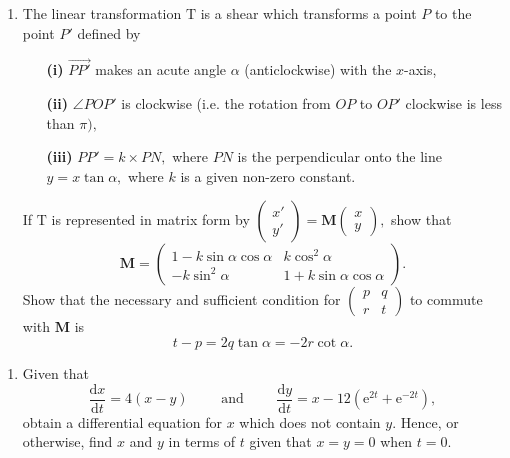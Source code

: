 \documentclass[a4, 11pt]{report}
\newlength{\qspace}
\newcounter{qnumber}
\newenvironment{question}%
 {\vspace{\qspace}
  \begin{enumerate}[\bfseries 1\quad][10]%
    \setcounter{enumi}{\value{qnumber}}%
    \item%
 }
{
  \end{enumerate}
  \filbreak
  \stepcounter{qnumber}
 }
\begin{document}
\begin{question}
The linear transformation $\mathrm{T}$ is a shear which transforms
a point $P$ to the point $P'$ defined by 

\begin{itemize}
\setlength{\itemsep}{3mm}
\item[\bf (i)] $\overrightarrow{PP'}$ makes an acute angle $\alpha$ (anticlockwise)
with the $x$-axis, 
\item[\bf (ii)] $\angle POP'$ is clockwise (i.e. the rotation from $OP$ to $OP'$
clockwise is less than $\pi),$ 
\item[\bf (iii)] $PP'=k\times PN,$ where $PN$ is the perpendicular onto the line
$y=x\tan\alpha,$ where $k$ is a given non-zero constant. 
\end{itemize}

If $\mathrm{T}$ is represented in matrix form by $\begin{pmatrix}x'\\
y'
\end{pmatrix}=\mathbf{M}\begin{pmatrix}x\\
y
\end{pmatrix},$ show that 
\[
\mathbf{M}=\begin{pmatrix}1-k\sin\alpha\cos\alpha & k\cos^{2}\alpha\\
-k\sin^{2}\alpha & 1+k\sin\alpha\cos\alpha
\end{pmatrix}.
\]
Show that the necessary and sufficient condition for $\begin{pmatrix}p & q\\
r & t
\end{pmatrix}$ to commute with $\mathbf{M}$ is 
\[
t-p=2q\tan\alpha=-2r\cot\alpha.
\]
	\end{question}
	
	\begin{question}
Given that 
\[
\frac{\mathrm{d}x}{\mathrm{d}t}=4(x-y)\qquad\mbox{ and }\qquad\frac{\mathrm{d}y}{\mathrm{d}t}=x-12(\mathrm{e}^{2t}+\mathrm{e}^{-2t}),
\]
obtain a differential equation for $x$ which does not contain $y$.
Hence, or otherwise, find $x$ and $y$ in terms of $t$ given that
$x=y=0$ when $t=0$. 
		\end{question}
		
\end{document}
